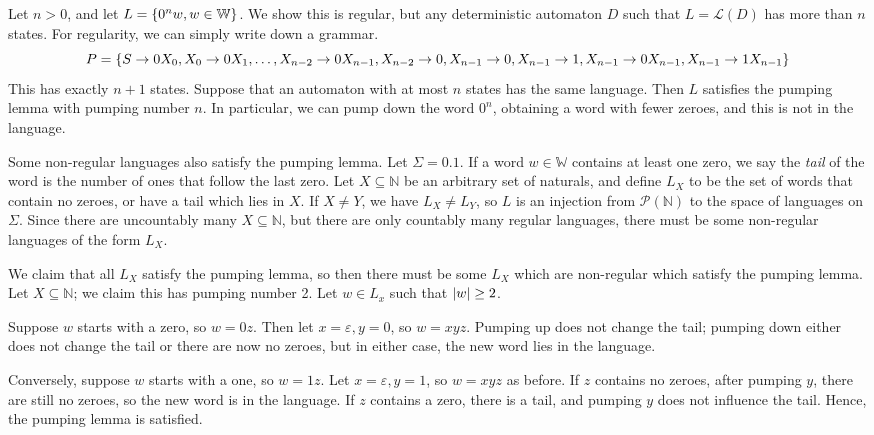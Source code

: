 \begin{example}
	Let \( n > 0 \), and let \( L = \qty{0^n w, w \in \mathbb W} \).
	We show this is regular, but any deterministic automaton \( D \) such that \( L = \mathcal L(D) \) has more than \( n \) states.
	For regularity, we can simply write down a grammar.
	\[ P = \qty{S \to 0X_0, X_0 \to 0X_1, \dots, X_{n-2} \to 0X_{n-1}, X_{n-2} \to 0, X_{n-1} \to 0, X_{n-1} \to 1, X_{n-1} \to 0X_{n-1}, X_{n-1} \to 1X_{n-1}} \]
	This has exactly \( n + 1 \) states.
	Suppose that an automaton with at most \( n \) states has the same language.
	Then \( L \) satisfies the pumping lemma with pumping number \( n \).
	In particular, we can pump down the word \( 0^n \), obtaining a word with fewer zeroes, and this is not in the language.
\end{example}
\begin{example}
	Some non-regular languages also satisfy the pumping lemma.
	Let \( \Sigma = \qty{0,1} \).
	If a word \( w \in \mathbb W \) contains at least one zero, we say the \emph{tail} of the word is the number of ones that follow the last zero.
	Let \( X \subseteq \mathbb N \) be an arbitrary set of naturals, and define \( L_X \) to be the set of words that contain no zeroes, or have a tail which lies in \( X \).
	If \( X \neq Y \), we have \( L_X \neq L_Y \), so \( L \) is an injection from \( \mathcal P(\mathbb N) \) to the space of languages on \( \Sigma \).
	Since there are uncountably many \( X \subseteq \mathbb N \), but there are only countably many regular languages, there must be some non-regular languages of the form \( L_X \).

	We claim that all \( L_X \) satisfy the pumping lemma, so then there must be some \( L_X \) which are non-regular which satisfy the pumping lemma.
	Let \( X \subseteq \mathbb N \); we claim this has pumping number 2.
	Let \( w \in L_x \) such that \( \abs{w} \geq 2 \).

	Suppose \( w \) starts with a zero, so \( w = 0z \).
	Then let \( x = \varepsilon, y = 0 \), so \( w = xyz \).
	Pumping up does not change the tail; pumping down either does not change the tail or there are now no zeroes, but in either case, the new word lies in the language.

	Conversely, suppose \( w \) starts with a one, so \( w = 1z \).
	Let \( x = \varepsilon, y = 1 \), so \( w = xyz \) as before.
	If \( z \) contains no zeroes, after pumping \( y \), there are still no zeroes, so the new word is in the language.
	If \( z \) contains a zero, there is a tail, and pumping \( y \) does not influence the tail.
	Hence, the pumping lemma is satisfied.
\end{example}

